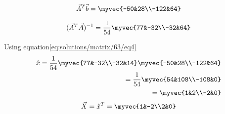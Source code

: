 \begin{align*}
\vec{A}^T\vec{b}=\myvec{-50&28\\-122&64}
\end{align*}

\begin{align*}
(\vec{A}^T\vec{A})^{-1}=\frac{1}{54}\myvec{77&-32\\-32&64} 
\end{align*}

Using equation\eqref{eq:solutions/matrix/63/eq4} 
\begin{align*}
\hat{x}=\frac{1}{54}\myvec{77&-32\\-32&14}\myvec{-50&28\\-122&64}\\
=\frac{1}{54}\myvec{54&108\\-108&0}\\
=\myvec{1&2\\-2&0}
\end{align*}
\begin{align*}
\vec{X}=\hat{x}^T=\myvec{1&-2\\2&0}  
\end{align*}

